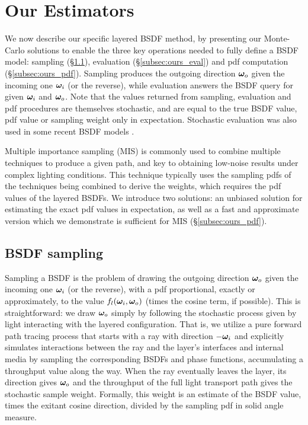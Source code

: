 \section{Our Estimators}
\label{sec:ours}
%
We now describe our specific layered BSDF method,
by presenting our Monte-Carlo solutions to enable the three key operations needed to fully define a BSDF model:
sampling (\S\ref{subsec:ours_sample}), evaluation (\S\ref{subsec:ours_eval}) and pdf computation (\S\ref{subsec:ours_pdf}).
Sampling produces the outgoing direction $\bm{\omega}_o$ given the incoming one $\bm{\omega}_i$ (or the reverse), while evaluation answers the BSDF query for given $\bm{\omega}_i$ and $\bm{\omega}_o$. Note that the values returned from sampling, evaluation and pdf procedures are themselves stochastic, and are equal to the true BSDF value, pdf value or sampling weight only in expectation. Stochastic evaluation was also used in some recent BSDF models \cite{Heitz:2016:MMB}. 

Multiple importance sampling (MIS) is commonly used to combine multiple techniques to produce a given path, and key to obtaining low-noise results under complex lighting conditions. This technique typically uses the sampling pdfs of the techniques being combined to derive the weights, which requires the pdf values of the layered BSDFs. We introduce two solutions: an unbiased solution for estimating the exact pdf values in expectation, as well as a fast and approximate version which we demonstrate is sufficient for MIS (\S\ref{subsec:ours_pdf}). 




\subsection{BSDF sampling}
\label{subsec:ours_sample}
%
Sampling a BSDF is the problem of drawing the outgoing direction $\bm{\omega}_o$ given the incoming one $\bm{\omega}_i$ (or the reverse), with a pdf proportional, exactly or approximately, to the value $f_l(\bm{\omega}_i, \bm{\omega}_o)$ (times the cosine term, if possible).
This is straightforward: we draw $\bm{\omega}_o$ simply by following the stochastic process given by light interacting with the layered configuration.
That is, we utilize a pure forward path tracing process that starts with a ray with direction $-\bm{\omega}_i$ and explicitly simulates interactions between the ray and the layer's interfaces and internal media by sampling the corresponding BSDFs and phase functions, accumulating a throughput value along the way.
When the ray eventually leaves the layer, its direction gives $\bm{\omega}_o$ and the throughput of the full light transport path gives the stochastic sample weight. Formally, this weight is an estimate of the BSDF value, times the exitant cosine direction, divided by the sampling pdf in solid angle measure.

